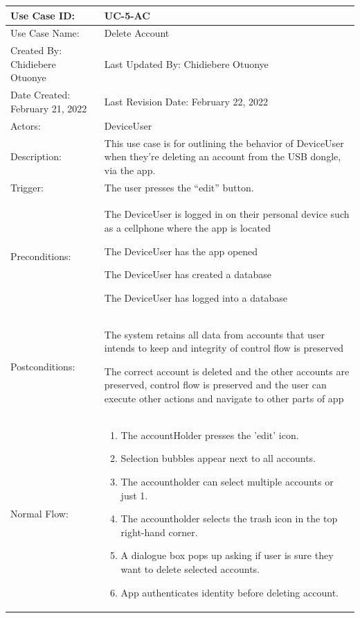 \documentclass[stu]{apa7}
\newcommand{\nextitem}{\par\hspace*{\labelsep}\textbullet\hspace*{\labelsep}}
\begin{document}
\scriptsize{\begin{xltabular}{\textwidth}{|l|X|}
  \hline Use Case ID: & UC-5-AC \\ \hline

  Use Case Name: & Delete Account \\ \hline

  Created By: Chidiebere Otuonye & Last Updated By: Chidiebere Otuonye \\ \hline

  Date Created: February 21, 2022 & Last Revision Date: February 22, 2022 \\ \hline

  Actors: & \nextitem DeviceUser \\ \hline
  
  Description: & This use case is for outlining the behavior of DeviceUser when they’re deleting an account from the USB dongle, via the app.\\ \hline

  Trigger: & The user presses the “edit” button. \\ \hline

  Preconditions: & \nextitem The DeviceUser is logged in on their personal device such as a cellphone where the app is located \nextitem The DeviceUser has the app opened \nextitem The DeviceUser has created a database \nextitem The DeviceUser has logged into a database \\ \hline

  Postconditions: & \nextitem The system retains all data from accounts that user intends to keep and integrity of control flow is preserved \nextitem The correct account is deleted and the other accounts are preserved, control flow is preserved and the user can execute other actions and navigate to other parts of app  \\ \hline

  Normal Flow: & 
    \begin{enumerate}
      \item The accountHolder presses the 'edit' icon.
      \item Selection bubbles appear next to all accounts.
      \item The accountholder can select multiple accounts or just 1.
      \item The accountholder selects the trash icon in the top right-hand corner.
      \item A dialogue box pops up asking if user is sure they want to delete selected accounts.
      \item App authenticates identity before deleting account.
    \end{enumerate} \\ \hline


\end{xltabular}}
\end{document}
